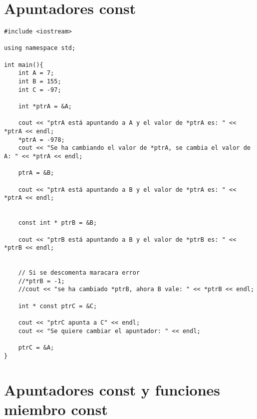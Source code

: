 \documentclass[12pt]{extarticle}
\newcommand{\<}{\langle}
\renewcommand{\>}{\rangle}
\theoremstyle{definition}
\begin{document}
\section{Apuntadores const}



\begin{lstlisting}
#include <iostream>

using namespace std;

int main(){
	int A = 7;
	int B = 155;
	int C = -97;
	
	int *ptrA = &A;
	
	cout << "ptrA está apuntando a A y el valor de *ptrA es: " << *ptrA << endl; 
	*ptrA = -978;
	cout << "Se ha cambiando el valor de *ptrA, se cambia el valor de A: " << *ptrA << endl;
	
	ptrA = &B;
	
	cout << "ptrA está apuntando a B y el valor de *ptrA es: " << *ptrA << endl; 
	
	
	const int * ptrB = &B;
	
	cout << "ptrB está apuntando a B y el valor de *ptrB es: " << *ptrB << endl;
	
	
	// Si se descomenta maracara error
	//*ptrB = -1;
	//cout << "se ha cambiado *ptrB, ahora B vale: " << *ptrB << endl;  
	
	int * const ptrC = &C;
	
	cout << "ptrC apunta a C" << endl; 
	cout << "Se quiere cambiar el apuntador: " << endl;
	
	ptrC = &A;
}
\end{lstlisting}

\section {Apuntadores const y funciones miembro const} 
\end{document}
